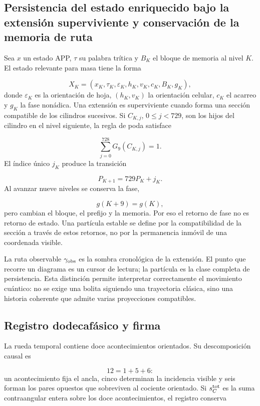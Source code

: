 \subsection{Persistencia del estado enriquecido bajo la extensión superviviente y conservación de la memoria de ruta}
Sea \(x\) un estado APP, \(\tau\) su palabra trítica y \(B_K\) el bloque de memoria al nivel \(K\). El estado relevante para masa tiene la forma

\[
X_K=(x_K,\tau_K,\varepsilon_K,h_K,v_K,c_K,B_K,g_K),
\]
donde \(\varepsilon_K\) es la orientación de hoja, \((h_K,v_K)\) la orientación celular, \(c_K\) el acarreo y \(g_K\) la fase nonádica. Una extensión es superviviente cuando forma una sección compatible de los cilindros sucesivos. Si \(C_{K,j}\), \(0\le j<729\), son los hijos del cilindro en el nivel siguiente, la regla de poda satisface

\[
\sum_{j=0}^{728}G_9(C_{K,j})=1.
\]
El índice único \(j_K\) produce la transición

\[
P_{K+1}=729P_K+j_K.
\]
Al avanzar nueve niveles se conserva la fase,

\[
g(K+9)=g(K),
\]
pero cambian el bloque, el prefijo y la memoria. Por eso el retorno de fase no es retorno de estado. Una partícula estable se define por la compatibilidad de la sección a través de estos retornos, no por la permanencia inmóvil de una coordenada visible.

La ruta observable \(\gamma_{\rm obs}\) es la sombra cronológica de la extensión. El punto que recorre un diagrama es un cursor de lectura; la partícula es la clase completa de persistencia. Esta distinción permite interpretar correctamente el movimiento cuántico: no se exige una bolita siguiendo una trayectoria clásica, sino una historia coherente que admite varias proyecciones compatibles.

\subsection{Registro dodecafásico y firma}
La rueda temporal contiene doce acontecimientos orientados. Su descomposición causal es

\[
12=1+5+6:
\]
un acontecimiento fija el ancla, cinco determinan la incidencia visible y seis forman los pares opuestos que sobreviven al cociente orientado. Si \(s_C^{\rm tot}\) es la suma contraangular entera sobre los doce acontecimientos, el registro conserva

